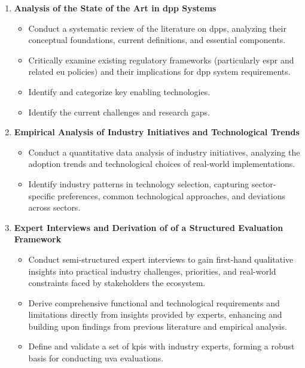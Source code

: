 \begin{enumerate}[label=\textbf{O\arabic*}, itemsep=\baselineskip]
    \item \textbf{Analysis of the State of the Art in \acrlong{dpp} Systems}
    \begin{itemize}
        \item Conduct a systematic review of the literature on \acrlong{dpp}s, analyzing their conceptual foundations, current definitions, and essential components.
        \item Critically examine existing regulatory frameworks (particularly \ac{espr} and related \ac{eu} policies) and their implications for \ac{dpp} system requirements.
        \item Identify and categorize key enabling technologies.
        \item Identify the current challenges and research gaps.
    \end{itemize}

    \item \textbf{Empirical Analysis of Industry Initiatives and Technological Trends}
    \begin{itemize}
        \item Conduct a quantitative data analysis of industry initiatives, analyzing the adoption trends and technological choices of real-world implementations.
        \item Identify industry patterns in technology selection, capturing sector-specific preferences, common technological approaches, and deviations across sectors.
    \end{itemize}

    \item \textbf{Expert Interviews and Derivation of of a Structured Evaluation Framework}
    \begin{itemize}
        \item Conduct semi-structured expert interviews to gain first-hand qualitative insights into practical industry challenges, priorities, and real-world constraints faced by stakeholders the ecosystem.
        \item Derive comprehensive functional and technological requirements and limitations directly from insights provided by experts, enhancing and building upon findings from previous literature and empirical analysis.
        \item Define and validate a set of \ac{kpi}s with industry experts, forming a robust basis for conducting \ac{uva} evaluations.
    \end{itemize}


\end{enumerate}
